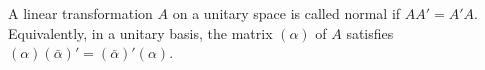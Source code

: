 A linear transformation $A$ on a unitary space is called normal if $AA' = A'A$. Equivalently, in a unitary basis, the matrix $(\alpha)$ of $A$ satisfies $(\alpha)(\bar{\alpha})' = (\bar{\alpha})'(\alpha)$.
